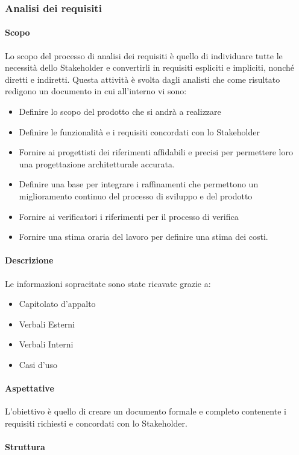 \subsubsection{Analisi dei requisiti}
\paragraph{Scopo}
Lo scopo del processo di analisi dei requisiti è quello di individuare tutte le necessità dello Stakeholder e convertirli in requisiti espliciti e impliciti, nonché diretti e indiretti. Questa attività è svolta dagli analisti che come risultato redigono un documento in cui all'interno vi sono:
\begin{itemize}
  \item Definire lo scopo del prodotto che si andrà a realizzare
  \item Definire le funzionalità e i requisiti concordati con lo Stakeholder
  \item Fornire ai progettisti dei riferimenti affidabili e precisi per permettere loro una progettazione architetturale accurata.
  \item Definire una base per integrare i raffinamenti che permettono un miglioramento continuo del processo di sviluppo e del prodotto
  \item Fornire ai verificatori i riferimenti per il processo di verifica
  \item Fornire una stima oraria del lavoro per definire una stima dei costi.
\end{itemize}

\paragraph{Descrizione}
Le informazioni sopracitate sono state ricavate grazie a:
\begin{itemize}
  \item Capitolato d'appalto
  \item Verbali Esterni
  \item Verbali Interni
  \item Casi d'uso
\end{itemize}

\paragraph{Aspettative}
L'obiettivo è quello di creare un documento formale e completo contenente i requisiti richiesti e concordati con lo Stakeholder.
\paragraph{Struttura}
